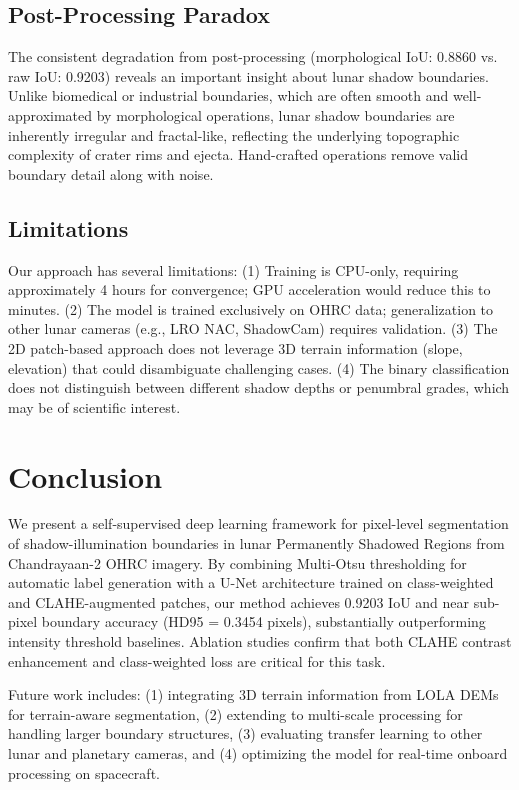 \documentclass[journal]{IEEEtran}
\begin{document}
\subsection{Post-Processing Paradox}

The consistent degradation from post-processing (morphological IoU: 0.8860 vs. raw IoU: 0.9203) reveals an important insight about lunar shadow boundaries. Unlike biomedical or industrial boundaries, which are often smooth and well-approximated by morphological operations, lunar shadow boundaries are inherently irregular and fractal-like, reflecting the underlying topographic complexity of crater rims and ejecta. Hand-crafted operations remove valid boundary detail along with noise.

\subsection{Limitations}

Our approach has several limitations: (1) Training is CPU-only, requiring approximately 4 hours for convergence; GPU acceleration would reduce this to minutes. (2) The model is trained exclusively on OHRC data; generalization to other lunar cameras (e.g., LRO NAC, ShadowCam) requires validation. (3) The 2D patch-based approach does not leverage 3D terrain information (slope, elevation) that could disambiguate challenging cases. (4) The binary classification does not distinguish between different shadow depths or penumbral grades, which may be of scientific interest.

\section{Conclusion}
\label{sec:conclusion}

We present a self-supervised deep learning framework for pixel-level segmentation of shadow-illumination boundaries in lunar Permanently Shadowed Regions from Chandrayaan-2 OHRC imagery. By combining Multi-Otsu thresholding for automatic label generation with a U-Net architecture trained on class-weighted and CLAHE-augmented patches, our method achieves 0.9203 IoU and near sub-pixel boundary accuracy (HD95 = 0.3454 pixels), substantially outperforming intensity threshold baselines. Ablation studies confirm that both CLAHE contrast enhancement and class-weighted loss are critical for this task.

Future work includes: (1) integrating 3D terrain information from LOLA DEMs for terrain-aware segmentation, (2) extending to multi-scale processing for handling larger boundary structures, (3) evaluating transfer learning to other lunar and planetary cameras, and (4) optimizing the model for real-time onboard processing on spacecraft.
\end{document}
